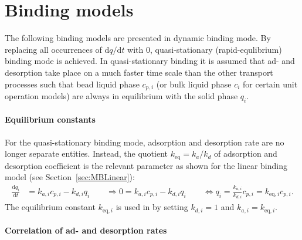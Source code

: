 %  
%  

\section{Binding models}

The following binding models  are presented in dynamic binding mode.
By replacing all occurrences of $\mathrm{d}q / \mathrm{d}t$ with $0$, quasi-stationary (rapid-equlibrium) binding mode is achieved. 
In quasi-stationary binding it is assumed that ad- and desorption take place on a much faster time scale than the other transport processes such that bead liquid phase $c_{p,i}$ (or bulk liquid phase $c_i$ for certain unit operation models) are always in equilibrium with the solid phase $q_i$.

\paragraph{Equilibrium constants}
\label{par:MBEquilibriumConstants}

For the quasi-stationary binding mode, adsorption and desorption rate are no longer separate entities. 
Instead, the quotient $k_{\text{eq}} = k_a / k_d$ of adsorption and desorption coefficient is the relevant parameter as shown for the linear binding model (see Section~\ref{sec:MBLinear}):
\begin{align*}
  \frac{\mathrm{d} q_i}{\mathrm{d} t} &= k_{a,i} c_{p,i} - k_{d,i} q_i \qquad \Rightarrow 0 = k_{a,i} c_{p,i} - k_{d,i} q_i \qquad \Leftrightarrow q_i = \frac{k_{a,i}}{k_{d,i}} c_{p,i} = k_{\text{eq},i} c_{p,i}.
\end{align*}
The equilibrium constant $k_{\text{eq},i}$ is used in \CADET{} by setting $k_{d,i} = 1$ and $k_{a,i} = k_{\text{eq},i}$.

\paragraph{Correlation of ad- and desorption rates}

